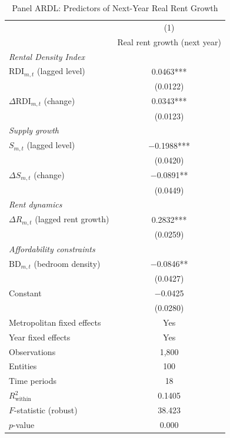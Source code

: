 \begin{table}[htbp]
\centering
\caption{Panel ARDL: Predictors of Next-Year Real Rent Growth}
\label{tab:ardl_results}
\begin{tabular}{lc}
\toprule
 & (1) \\
 & Real rent growth (next year) \\
\midrule
\textit{Rental Density Index} & \\
$\text{RDI}_{m,t}$ (lagged level) & 0.0463*** \\
                                   & (0.0122)  \\
$\Delta\text{RDI}_{m,t}$ (change)  & 0.0343*** \\
                                   & (0.0123)  \\
\addlinespace
\textit{Supply growth} & \\
$S_{m,t}$ (lagged level)           & $-$0.1988*** \\
                                   & (0.0420)  \\
$\Delta S_{m,t}$ (change)          & $-$0.0891** \\
                                   & (0.0449)  \\
\addlinespace
\textit{Rent dynamics} & \\
$\Delta R_{m,t}$ (lagged rent growth) & 0.2832*** \\
                                      & (0.0259)  \\
\addlinespace
\textit{Affordability constraints} & \\
$\text{BD}_{m,t}$ (bedroom density) & $-$0.0846** \\
                                    & (0.0427)  \\
\addlinespace
Constant                           & $-$0.0425 \\
                                   & (0.0280)  \\
\midrule
Metropolitan fixed effects         & Yes \\
Year fixed effects                 & Yes \\
Observations                       & 1,800 \\
Entities                           & 100 \\
Time periods                       & 18 \\
$R^2_{\text{within}}$              & 0.1405 \\
$F$-statistic (robust)             & 38.423 \\
$p$-value                          & 0.000 \\

\end{tabular}
\end{table}
